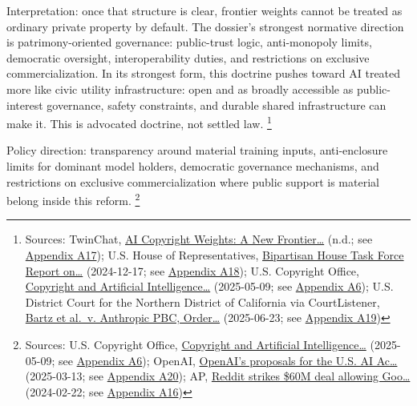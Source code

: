 \documentclass[
  american,
  11pt,
  letterpaper,
]{article}
\begin{document}
Interpretation: once that structure is clear, frontier weights cannot be
treated as ordinary private property by default. The dossier's strongest
normative direction is patrimony-oriented governance: public-trust
logic, anti-monopoly limits, democratic oversight, interoperability
duties, and restrictions on exclusive commercialization. In its
strongest form, this doctrine pushes toward AI treated more like civic
utility infrastructure: open and as broadly accessible as
public-interest governance, safety constraints, and durable shared
infrastructure can make it. This is advocated doctrine, not settled law.
\footnote{Sources: TwinChat,
  \href{https://medium.com/twinchat/ai-copyright-weights-a-new-frontier-in-intellectual-property-law-d8ee1b6c55ee}{AI
  Copyright Weights: A New Frontier\ldots{}} (n.d.; see
  \hyperref[appendix-a17-ai-copyright-weights-a-new-frontier-in-intellectual-property-law]{Appendix
  A17}); U.S. House of Representatives,
  \href{https://www.speaker.gov/wp-content/uploads/2024/12/AI-Task-Force-Report-FINAL.pdf}{Bipartisan
  House Task Force Report on\ldots{}} (2024-12-17; see
  \hyperref[appendix-a18-bipartisan-house-task-force-report-on-artificial-intelligence]{Appendix
  A18}); U.S. Copyright Office,
  \href{https://copyright.gov/ai/Copyright-and-Artificial-Intelligence-Part-3-Generative-AI-Training-Report-Pre-Publication-Version.pdf}{Copyright
  and Artificial Intelligence\ldots{}} (2025-05-09; see
  \hyperref[appendix-a6-copyright-and-artificial-intelligence-part-3-generative-ai-training-pre-publication-version]{Appendix
  A6}); U.S. District Court for the Northern District of California via
  CourtListener,
  \href{https://storage.courtlistener.com/recap/gov.uscourts.cand.434709/gov.uscourts.cand.434709.231.0_3.pdf}{Bartz
  et al.~v. Anthropic PBC, Order\ldots{}} (2025-06-23; see
  \hyperref[appendix-a19-bartz-et-al-v-anthropic-pbc-order-on-fair-use]{Appendix
  A19})}

Policy direction: transparency around material training inputs,
anti-enclosure limits for dominant model holders, democratic governance
mechanisms, and restrictions on exclusive commercialization where public
support is material belong inside this reform. \footnote{Sources: U.S.
  Copyright Office,
  \href{https://copyright.gov/ai/Copyright-and-Artificial-Intelligence-Part-3-Generative-AI-Training-Report-Pre-Publication-Version.pdf}{Copyright
  and Artificial Intelligence\ldots{}} (2025-05-09; see
  \hyperref[appendix-a6-copyright-and-artificial-intelligence-part-3-generative-ai-training-pre-publication-version]{Appendix
  A6}); OpenAI,
  \href{https://openai.com/global-affairs/openai-proposals-for-the-us-ai-action-plan/}{OpenAI's
  proposals for the U.S. AI Ac\ldots{}} (2025-03-13; see
  \hyperref[appendix-a20-openais-proposals-for-the-us-ai-action-plan]{Appendix
  A20}); AP,
  \href{https://apnews.com/article/a7f131c7cb4225307134ef21d3c6a708}{Reddit
  strikes \$60M deal allowing Goo\ldots{}} (2024-02-22; see
  \hyperref[appendix-a16-reddit-strikes-60m-deal-allowing-google-to-train-ai-models-on-its-posts-unveils-ipo-plans]{Appendix
  A16})}
\end{document}
